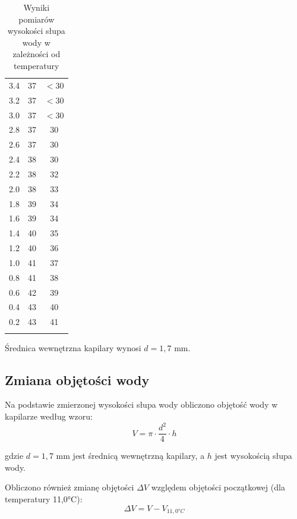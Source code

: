 \documentclass[a4paper,12pt]{article}
\begin{document}
\begin{longtable}{|c|c|c|}
    3.4  & 37 & $<30$ \\
    3.2  & 37 & $<30$ \\
    3.0  & 37 & $<30$ \\
    2.8  & 37 & 30 \\
    2.6  & 37 & 30 \\
    2.4  & 38 & 30 \\
    2.2  & 38 & 32 \\
    2.0  & 38 & 33 \\
    1.8  & 39 & 34 \\
    1.6  & 39 & 34 \\
    1.4  & 40 & 35 \\
    1.2  & 40 & 36 \\
    1.0  & 41 & 37 \\
    0.8  & 41 & 38 \\
    0.6  & 42 & 39 \\
    0.4  & 43 & 40 \\
    0.2  & 43 & 41 \\
    \hline
    \caption{Wyniki pomiarów wysokości słupa wody w zależności od temperatury}
    \label{tab:pomiary_wysokosci}
\end{longtable}

Średnica wewnętrzna kapilary wynosi $d = 1{,}7 $ mm.

\subsection{Zmiana objętości wody}

Na podstawie zmierzonej wysokości słupa wody obliczono objętość wody w kapilarze według wzoru:
\begin{equation}
    V = \pi \cdot \frac{d^2}{4} \cdot h
\end{equation}

gdzie $d = 1,7$ mm jest średnicą wewnętrzną kapilary, a $h$ jest wysokością słupa wody.

Obliczono również zmianę objętości $\Delta V$ względem objętości początkowej (dla temperatury 11,0°C):
\begin{equation}
    \Delta V = V - V_{11,0°C}
\end{equation}
\end{document}
